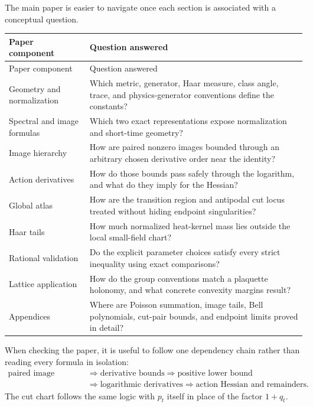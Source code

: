 \documentclass[11pt]{article}
\theoremstyle{definition}
\begin{document}
The main paper is easier to navigate once each section is associated with a
conceptual question.

\begin{longtable}{p{}p{}}
\toprule
Paper component & Question answered \\
\midrule
\endfirsthead
\toprule
Paper component & Question answered \\
\midrule
\endhead
Geometry and normalization & Which metric, generator, Haar measure, class
angle, trace, and physics-generator conventions define the constants? \\
Spectral and image formulas & Which two exact representations expose
normalization and short-time geometry? \\
Image hierarchy & How are paired nonzero images bounded through an arbitrary
chosen derivative order near the identity? \\
Action derivatives & How do those bounds pass safely through the logarithm,
and what do they imply for the Hessian? \\
Global atlas & How are the transition region and antipodal cut locus treated
without hiding endpoint singularities? \\
Haar tails & How much normalized heat-kernel mass lies outside the local
small-field chart? \\
Rational validation & Do the explicit parameter choices satisfy every strict
inequality using exact comparisons? \\
Lattice application & How do the group conventions match a plaquette
holonomy, and what concrete convexity margins result? \\
Appendices & Where are Poisson summation, image tails, Bell polynomials,
cut-pair bounds, and endpoint limits proved in detail? \\
\bottomrule
\end{longtable}

When checking the paper, it is useful to follow one dependency chain rather
than reading every formula in isolation:
\begin{equation}\label{expl:eq:dependency-chain}
\begin{aligned}
 \text{paired image formula}
 &\Longrightarrow \text{derivative bounds}
 \Longrightarrow \text{positive lower bound}\\
 &\Longrightarrow \text{logarithmic derivatives}
 \Longrightarrow \text{action Hessian and remainders}.
\end{aligned}
\end{equation}
The cut chart follows the same logic with $p_t$ itself in place of the factor
$1+q_t$.
\end{document}
